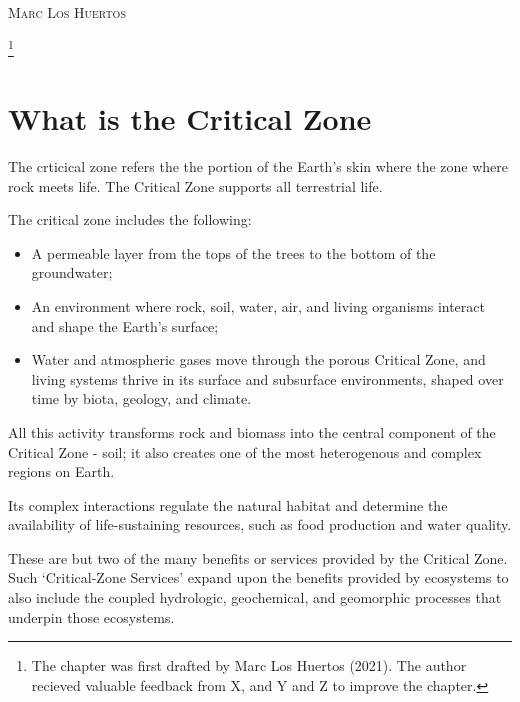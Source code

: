\documentclass{book}\usepackage{knitr}
\makeatletter
\newcommand{\chapterauthor}[1]{%
  {\parindent0pt\vspace*{-25pt}%
  \linespread{1.1}\large\scshape#1%
  \par\nobreak\vspace*{35pt}}
  \@afterheading%
}
\makeatother
\begin{document}
\chapterauthor{Marc Los Huertos}\footnote{The chapter was first drafted by Marc Los Huertos (2021). The author recieved valuable feedback from X, and Y and Z to improve the chapter.}

\section{What is the Critical Zone}

The crticical zone refers the the portion of the Earth's skin where the zone where rock meets life. The Critical Zone supports all terrestrial life.

The critical zone includes the following:

\begin{itemize}
  \item A permeable layer from the tops of the trees to the bottom of the groundwater;
  \item An environment where rock, soil, water, air, and living organisms interact and shape the Earth's surface;
  \item Water and atmospheric gases move through the porous Critical Zone, and living systems thrive in its surface and subsurface environments, shaped over time by biota, geology, and climate.
\end{itemize}

All this activity transforms rock and biomass into the central component of the Critical Zone - soil; it also creates one of the most heterogenous and complex regions on Earth.

Its complex interactions regulate the natural habitat and determine the availability of life-sustaining resources, such as food production and water quality.

These are but two of the many benefits or services provided by the Critical Zone. Such `Critical-Zone Services' expand upon the benefits provided by ecosystems to also include the coupled hydrologic, geochemical, and geomorphic processes that underpin those ecosystems.
\end{document}
